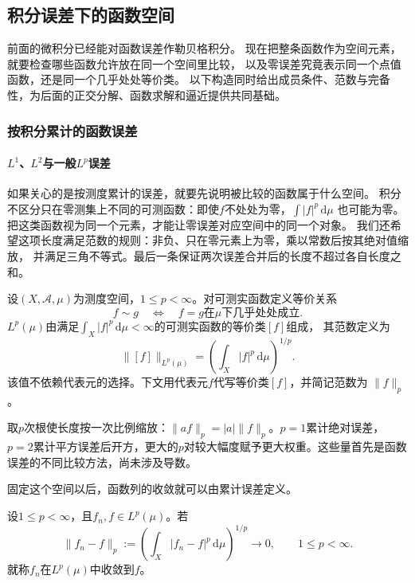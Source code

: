 \subsection{积分误差下的函数空间}
\label{sec:functional-lp-construction}

前面的微积分已经能对函数误差作勒贝格积分。
现在把整条函数作为空间元素，就要检查哪些函数允许放在同一个空间里比较，
以及零误差究竟表示同一个点值函数，还是同一个几乎处处等价类。
以下构造同时给出成员条件、范数与完备性，为后面的正交分解、函数求解和逼近提供共同基础。

\subsubsection{按积分累计的函数误差}
\paragraph{$L^1$、$L^2$与一般$L^p$误差}

如果关心的是按测度累计的误差，就要先说明被比较的函数属于什么空间。
积分不区分只在零测集上不同的可测函数：即使$f$不处处为零，$\int|f|^p\,\mathrm d\mu$
也可能为零。把这类函数视为同一个元素，才能让零误差对应空间中的同一个对象。
我们还希望这项长度满足范数的规则：非负、只在零元素上为零，乘以常数后按其绝对值缩放，
并满足三角不等式。最后一条保证两次误差合并后的长度不超过各自长度之和。
\begin{definition}[$L^p$空间与范数]
\label{def:analysis-lp-space}
设$(X,\mathcal A,\mu)$为测度空间，$1\leq p<\infty$。对可测实函数定义等价关系
\[
  f\sim g\quad\Longleftrightarrow\quad f=g\text{在$\mu$下几乎处处成立}.
\]
$L^p(\mu)$由满足$\int_X|f|^p\,\mathrm d\mu<\infty$的可测实函数的等价类$[f]$组成，
其范数定义为
\[
  \lVert[f]\rVert_{L^p(\mu)}
  =\left(\int_X|f|^p\,\mathrm d\mu\right)^{1/p}.
\]
该值不依赖代表元的选择。下文用代表元$f$代写等价类$[f]$，并简记范数为
$\lVert f\rVert_p$。
\end{definition}

取$p$次根使长度按一次比例缩放：$\lVert af\rVert_p=|a|\lVert f\rVert_p$。$p=1$累计绝对误差，$p=2$累计平方误差后开方，更大的$p$对较大幅度赋予更大权重。这些量首先是函数误差的不同比较方法，尚未涉及导数。

固定这个空间以后，函数列的收敛就可以由累计误差定义。
\begin{definition}[$L^p$收敛]
\label{def:analysis-lp-convergence}
设$1\leq p<\infty$，且$f_n,f\in L^p(\mu)$。若
\begin{equation}
  \lVert f_n-f\rVert_p
  :=
  \left(
    \int_X|f_n-f|^p\,\mathrm{d}\mu
  \right)^{1/p}
  \longrightarrow0,
  \qquad 1\leq p<\infty.
\label{eq:analysis-lp-convergence}
\end{equation}
就称$f_n$在$L^p(\mu)$中收敛到$f$。
\end{definition}

